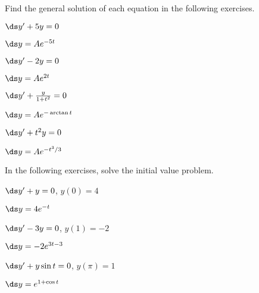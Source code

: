 \begin{enumialphparenastyle}

Find the general solution of each equation in the following exercises.

\begin{multicols}{2}
\begin{ex}
 $\ds y'+5y=0$
\begin{sol}
 $\ds y=Ae^{-5t}$
\end{sol}
\end{ex}


\begin{ex}
 $\ds y'-2y=0$
\begin{sol}
 $\ds y=Ae^{2t}$
\end{sol}
\end{ex}


\begin{ex}
 $\ds y'+{y\over 1+t^2}=0$
\begin{sol}
 $\ds y=Ae^{-\arctan t}$
\end{sol}
\end{ex}


\begin{ex}
 $\ds y'+t^2y=0$
\begin{sol}
 $\ds y=Ae^{-t^3/3}$
\end{sol}
\end{ex}

\end{multicols}

In the following exercises, solve the initial value problem.

\begin{multicols}{2}

\begin{ex}
 $\ds y' + y=0$, $y(0)=4$
\begin{sol}
 $\ds y=4e^{-t}$
\end{sol}
\end{ex}


\begin{ex}
 $\ds y' -3y=0$, $y(1)=-2$
\begin{sol}
 $\ds y=-2e^{3t-3}$
\end{sol}
\end{ex}


\begin{ex}
 $\ds y' + y\sin t = 0$, $y(\pi)=1$
\begin{sol}
 $\ds y=e^{1+\cos t}$
\end{sol}
\end{ex}



\end{multicols}
\end{enumialphparenastyle}

